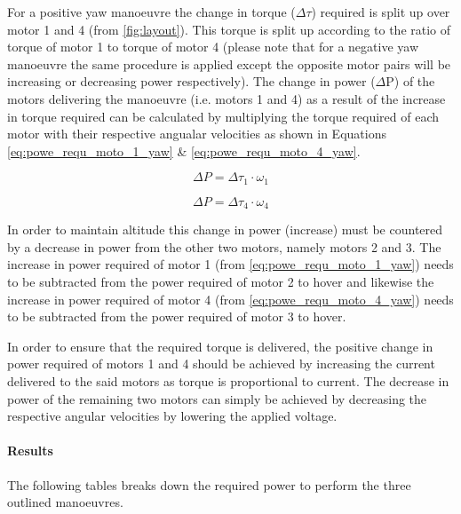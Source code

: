 For a positive yaw manoeuvre the change in torque ($\Delta \tau$) required is split up over motor 1 and 4 (from \autoref{fig:layout}). This torque is split up according to the ratio of torque of motor 1 to torque of motor 4 (please note that for a negative yaw manoeuvre the same procedure is applied except the opposite motor pairs will be increasing or decreasing power respectively). The change in power ($\Delta$P) of the motors delivering the manoeuvre (i.e. motors 1 and 4) as a result of the increase in torque required can be calculated by multiplying the torque required of each motor with their respective angualar velocities as shown in Equations \ref{eq:powe_requ_moto_1_yaw} \& \ref{eq:powe_requ_moto_4_yaw}. \newline

\begin{minipage}{0.48\textwidth}
    \begin{equation}
    \label{eq:powe_requ_moto_1_yaw}
    \Delta P = \Delta \tau_1 \cdot \omega_1
    \end{equation}  
\end{minipage}%
\begin{minipage}{0.48\textwidth}
    \begin{equation}
    \label{eq:powe_requ_moto_4_yaw}
    \Delta P = \Delta \tau_4 \cdot \omega_4
    \end{equation}
\end{minipage}
\newline

In order to maintain altitude this change in power (increase) must be countered by a decrease in power from the other two motors, namely motors 2 and 3. The increase in power required of motor 1 (from \autoref{eq:powe_requ_moto_1_yaw}) needs to be subtracted from the power required of motor 2 to hover and likewise the increase in power required of motor 4 (from \autoref{eq:powe_requ_moto_4_yaw}) needs to be subtracted from the power required of motor 3 to hover.

In order to ensure that the required torque is delivered, the positive change in power required of motors 1 and 4 should be achieved by increasing the current delivered to the said motors as torque is proportional to current. The decrease in power of the remaining two motors can simply be achieved by decreasing the respective angular velocities by lowering the applied voltage.

\paragraph{Results}
The following tables breaks down the required power to perform the three outlined manoeuvres.


